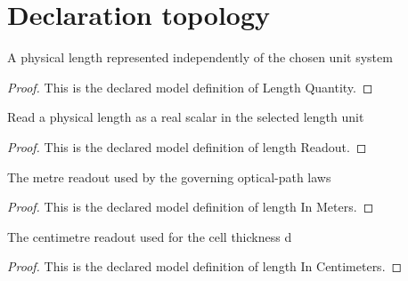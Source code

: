 \section{Declaration topology}
\begin{definition}
  \label{def:physics:phyx-mini-0250:phyxminiproblems-problemphyxmini0250-lengthquantity}
  A physical length represented independently of the chosen unit system
\end{definition}
\begin{proof}
  This is the declared model definition of Length Quantity.
\end{proof}
\begin{definition}
  \label{def:physics:phyx-mini-0250:phyxminiproblems-problemphyxmini0250-lengthreadout}
  Read a physical length as a real scalar in the selected length unit
\end{definition}
\begin{proof}
  This is the declared model definition of length Readout.
\end{proof}
\begin{definition}
  \label{def:physics:phyx-mini-0250:phyxminiproblems-problemphyxmini0250-lengthinmeters}
  The metre readout used by the governing optical-path laws
\end{definition}
\begin{proof}
  This is the declared model definition of length In Meters.
\end{proof}
\begin{definition}
  \label{def:physics:phyx-mini-0250:phyxminiproblems-problemphyxmini0250-lengthincentimeters}
  The centimetre readout used for the cell thickness d
\end{definition}
\begin{proof}
  This is the declared model definition of length In Centimeters.
\end{proof}
